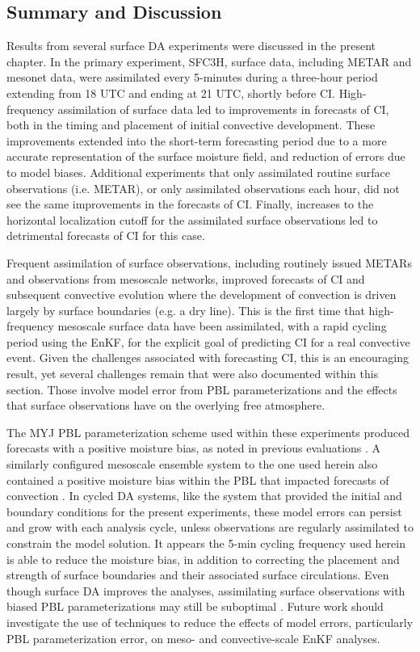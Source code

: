 \subsection{Summary and Discussion}
Results from several surface DA experiments were discussed in the present chapter. In the primary experiment, SFC3H, surface data, including METAR and mesonet data, were assimilated every 5-minutes during a three-hour period extending from 18 UTC and ending at 21 UTC, shortly before CI. High-frequency assimilation of surface data led to improvements in forecasts of CI, both in the timing and placement of initial convective development. These improvements extended into the short-term forecasting period due to a more accurate representation of the surface moisture field, and reduction of errors due to model biases. Additional experiments that only assimilated routine surface observations (i.e. METAR), or only assimilated observations each hour, did not see the same improvements in the forecasts of CI. Finally, increases to the horizontal localization cutoff for the assimilated surface observations led to detrimental forecasts of CI for this case.

Frequent assimilation of surface observations, including routinely issued METARs and observations from mesoscale networks, improved forecasts of CI and subsequent convective evolution where the development of convection is driven largely by surface boundaries (e.g. a dry line). This is the first time that high-frequency mesoscale surface data have been assimilated, with a rapid cycling period using the EnKF, for the explicit goal of predicting CI for a real convective event. Given the challenges associated with forecasting CI, this is an encouraging result, yet several challenges remain that were also documented within this section. Those involve model error from PBL parameterizations and the effects that surface observations have on the overlying free atmosphere.

The MYJ PBL parameterization scheme used within these experiments produced forecasts with a positive moisture bias, as noted in previous evaluations \citep{huetal10}. A similarly configured mesoscale ensemble system to the one used herein also contained a positive moisture bias within the PBL that impacted forecasts of convection \citep{romineetal13}. In cycled DA systems, like the system that provided the initial and boundary conditions for the present experiments, these model errors can persist and grow with each analysis cycle, unless observations are regularly assimilated to constrain the model solution. It appears the 5-min cycling frequency used herein is able to reduce the moisture bias, in addition to correcting the placement and strength of surface boundaries and their associated surface circulations. Even though surface DA improves the analyses, assimilating surface observations with biased PBL parameterizations may still be suboptimal \citep{deedasilva98}. Future work should investigate the use of techniques to reduce the effects of model errors, particularly PBL parameterization error, on meso- and convective-scale EnKF analyses.

